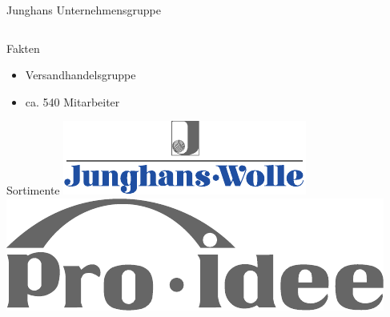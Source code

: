 \begin{frame}{Junghans Unternehmensgruppe}
\begin{columns}
		\begin{column}{.55\textwidth}
			\begin{block}{Fakten}
				\begin{itemize}
						\item Versandhandelsgruppe
						\item ca. 540 Mitarbeiter
				\end{itemize}
			\end{block}
			\vspace*{2ex}
			\begin{block}{Sortimente}
				\hspace*{.37\textwidth}
				\includegraphics[width=.63\textwidth]{images/J_60_Schwarz_Reflex_Blue}
				\\
				\includegraphics[width=.63\textwidth]{images/ProIdeeLogo}
			\end{block}
		\end{column}
	\end{columns}
\end{frame}

